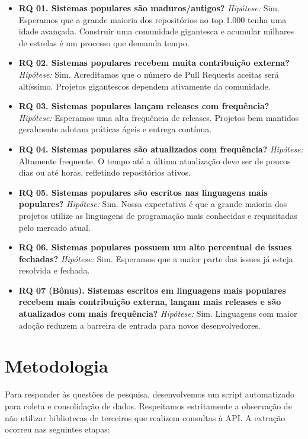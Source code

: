 \documentclass[12pt,a4paper]{article}
\begin{document}
\begin{itemize}
    \item \textbf{RQ 01. Sistemas populares são maduros/antigos?}
    \textit{Hipótese:} Sim. Esperamos que a grande maioria dos repositórios no top 1.000 tenha uma idade avançada. Construir uma comunidade gigantesca e acumular milhares de estrelas é um processo que demanda tempo.
    
    \item \textbf{RQ 02. Sistemas populares recebem muita contribuição externa?}
    \textit{Hipótese:} Sim. Acreditamos que o número de Pull Requests aceitas será altíssimo. Projetos gigantescos dependem ativamente da comunidade.
    
    \item \textbf{RQ 03. Sistemas populares lançam releases com frequência?}
    \textit{Hipótese:} Esperamos uma alta frequência de releases. Projetos bem mantidos geralmente adotam práticas ágeis e entrega contínua.
    
    \item \textbf{RQ 04. Sistemas populares são atualizados com frequência?}
    \textit{Hipótese:} Altamente frequente. O tempo até a última atualização deve ser de poucos dias ou até horas, refletindo repositórios ativos.
    
    \item \textbf{RQ 05. Sistemas populares são escritos nas linguagens mais populares?}
    \textit{Hipótese:} Sim. Nossa expectativa é que a grande maioria dos projetos utilize as linguagens de programação mais conhecidas e requisitadas pelo mercado atual.
    
    \item \textbf{RQ 06. Sistemas populares possuem um alto percentual de issues fechadas?}
    \textit{Hipótese:} Sim. Esperamos que a maior parte das issues já esteja resolvida e fechada.
    
    \item \textbf{RQ 07 (Bônus). Sistemas escritos em linguagens mais populares recebem mais contribuição externa, lançam mais releases e são atualizados com mais frequência?}
    \textit{Hipótese:} Sim. Linguagens com maior adoção reduzem a barreira de entrada para novos desenvolvedores.
\end{itemize}

\section{Metodologia}
Para responder às questões de pesquisa, desenvolvemos um script automatizado para coleta e consolidação de dados. Respeitamos estritamente a observação de não utilizar bibliotecas de terceiros que realizem consultas à API. A extração ocorreu nas seguintes etapas:
\end{document}
